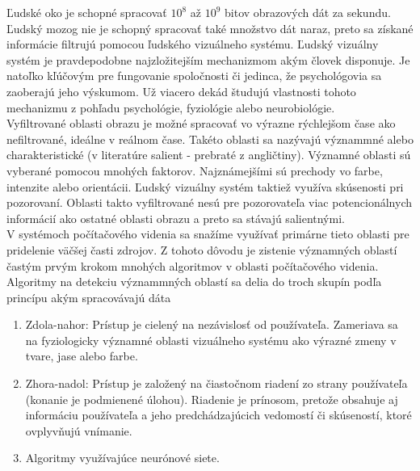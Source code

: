 
Ľudské oko je schopné spracovať \begin{math}10^8\end{math} až \begin{math}10^9\end{math} bitov obrazových dát za sekundu.
Ľudský mozog nie je schopný spracovať také množstvo dát naraz, preto sa získané informácie filtrujú pomocou ľudského vizuálneho systému\cite{Fmph-videnie}.
Ľudský vizuálny systém je pravdepodobne najzložitejším mechanizmom akým človek disponuje.
Je natoľko kľúčovým pre fungovanie spoločnosti či jedinca, že psychológovia sa zaoberajú jeho výskumom.
Už viacero dekád študujú vlastnosti tohoto mechanizmu z pohľadu psychológie, fyziológie alebo neurobiológie.
\\
Vyfiltrované oblasti obrazu je možné spracovať vo výrazne rýchlejšom čase ako nefiltrované, ideálne v reálnom čase.
Takéto oblasti sa nazývajú význammné alebo charakteristické (v literatúre salient - prebraté z angličtiny).
Významné oblasti sú vyberané pomocou mnohých faktorov.
Najznámejšími sú prechody vo farbe, intenzite alebo orientácii.
Ľudský vizuálny systém taktiež využíva skúsenosti pri pozorovaní.
Oblasti takto vyfiltrované nesú pre pozorovateľa viac potencionálnych informácií ako ostatné oblasti obrazu a preto sa stávajú salientnými.
\\
V systémoch počítačového videnia sa snažíme využívať primárne tieto oblasti pre pridelenie väčšej časti zdrojov.
Z tohoto dôvodu je zistenie významných oblastí častým prvým krokom mnohých algoritmov v oblasti počítačového videnia.
\\
Algoritmy na detekciu význammných oblastí sa delia do troch skupín podľa princípu akým spracovávajú dáta\cite{brief-survey}

  \begin{enumerate}
          \item Zdola-nahor: Prístup je cielený na nezávislosť od používateľa.
          Zameriava sa na fyziologicky významné oblasti vizuálneho systému ako výrazné zmeny v tvare, jase alebo farbe.
          \item Zhora-nadol: Prístup je založený na čiastočnom riadení zo strany používateľa (konanie je podmienené úlohou).
          Riadenie je prínosom, pretože obsahuje aj informáciu používateľa a jeho predchádzajúcich vedomostí či skúseností, ktoré ovplyvňujú vnímanie.
          \item Algoritmy využívajúce neurónové siete.
  \end{enumerate}

